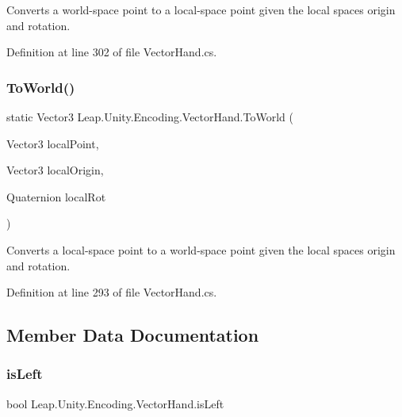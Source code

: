 Converts a world-\/space point to a local-\/space point given the local space\textquotesingle{}s origin and rotation. 



Definition at line 302 of file Vector\+Hand.\+cs.

\mbox{\label{class_leap_1_1_unity_1_1_encoding_1_1_vector_hand_aead2e66fb2e278e48b313c30d31c3f6f}} 
\subsubsection{\texorpdfstring{ToWorld()}{ToWorld()}}
{\footnotesize\ttfamily static Vector3 Leap.\+Unity.\+Encoding.\+Vector\+Hand.\+To\+World (\begin{DoxyParamCaption}\item[{Vector3}]{local\+Point,  }\item[{Vector3}]{local\+Origin,  }\item[{Quaternion}]{local\+Rot }\end{DoxyParamCaption})\hspace{0.3cm}{\ttfamily [static]}}



Converts a local-\/space point to a world-\/space point given the local space\textquotesingle{}s origin and rotation. 



Definition at line 293 of file Vector\+Hand.\+cs.



\subsection{Member Data Documentation}
\mbox{\label{class_leap_1_1_unity_1_1_encoding_1_1_vector_hand_a9f9b64bc63a9f3cc55333dd6086d9343}} 
\subsubsection{\texorpdfstring{isLeft}{isLeft}}
{\footnotesize\ttfamily bool Leap.\+Unity.\+Encoding.\+Vector\+Hand.\+is\+Left}



